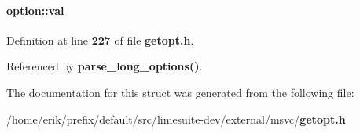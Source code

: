 \paragraph[{val}]{ option\+::val}\label{structoption_a13bd155ec3b405d29c41ab8d0793be11}


Definition at line {\bf 227} of file {\bf getopt.\+h}.



Referenced by {\bf parse\+\_\+long\+\_\+options()}.



The documentation for this struct was generated from the following file\+:\begin{DoxyCompactItemize}
\item 
/home/erik/prefix/default/src/limesuite-\/dev/external/msvc/{\bf getopt.\+h}\end{DoxyCompactItemize}
